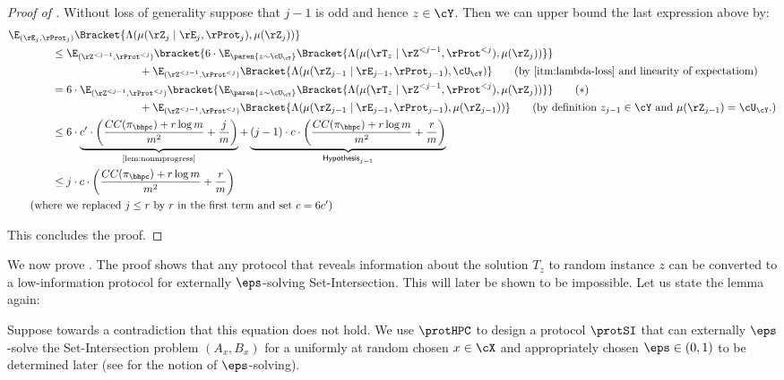 \begin{proof}[Proof of ]
	Without loss of generality suppose that $j-1$ is odd and hence $z \in \cY$. Then 
	we can upper bound the last expression above by:
	\begin{align*}
		&\E_{(\rE_j,\rProt_j)} \Bracket{\Lambda(\mu(\rZ_j \mid \rE_j,\rProt_j),\mu(\rZ_j))}  \\
		&\qquad \qquad \leq \E_{(\rZ^{<j-1},\rProt^{<j})} \bracket{6 \cdot \E_{\paren{z \sim \cU_{\cY}}}\Bracket{\Lambda(\mu(\rT_{z} \mid \rZ^{<j-1},\rProt^{<j}),\mu(\rZ_j))}} \\
		 &\qquad \qquad  \qquad \qquad \qquad  \qquad + \E_{(\rZ^{<j-1},\rProt^{<j})} \Bracket{\Lambda(\mu(\rZ_{j-1} \mid \rE_{j-1},\rProt_{j-1}),\cU_\cY)} %
   \tag{by \Cref{itm:lambda-loss} and linearity of expectatiom}
   \\
   &\qquad \qquad = 6 \cdot\E_{(\rZ^{<j-1},\rProt^{<j})} \bracket{ \E_{\paren{z \sim \cU_{\cY}}}\Bracket{\Lambda(\mu(\rT_{z} \mid \rZ^{<j-1},\rProt^{<j}),\mu(\rZ_j))}} \tag{$\ast$}\label{eq:final-inequality}\\
		 &\qquad \qquad  \qquad \qquad \qquad  \qquad + \E_{(\rZ^{<j-1},\rProt^{<j})} \Bracket{\Lambda(\mu(\rZ_{j-1} \mid \rE_{j-1},\rProt_{j-1}),\mu(\rZ_{j-1}))}\tag{by definition $z_{j-1} \in \cY$ and $\mu(\rZ_{j-1}) = \cU_\cY$.}\\
   &\qquad \qquad\leq 6 \cdot \underbrace{c' \cdot \left( \frac{CC(\pi_\bhpc)+r\log m}{m^2} + \frac{j} m\right)}_{\text{\Cref{lem:nonmprogress}}} + \underbrace{(j-1) \cdot c \cdot \left( \frac{CC(\pi_\bhpc)+r\log m}{m^2} + \frac{r} m\right)}_{\mathsf{Hypothesis}_{j-1}}\\
  & \qquad \qquad\leq j \cdot c \cdot \left( \frac{CC(\pi_\bhpc)+r\log m}{m^2} + \frac{r} m\right) \\
  &\tag{where we replaced $j \leq r$ by $r$ in the first term and set $c = 6c'$}
	\end{align*}

This concludes the proof.
\end{proof}


\bigskip\noindent
We now prove . The proof shows that any protocol that reveals information about the solution $T_z$ to random instance $z$ can be converted to a low-information protocol for externally $\eps$-solving Set-Intersection. This will later be shown to be impossible. Let us state the lemma again:

\nonmprogress*
Suppose towards a contradiction that this equation does not hold. We use $\protHPC$ to design a protocol $\protSI$
	that can externally $\eps$-solve the Set-Intersection problem $(A_x,B_x)$ for a uniformly at random chosen $x \in \cX$ and appropriately chosen $\eps \in (0,1)$ to be determined later (see  for the notion of $\eps$-solving). 
	
